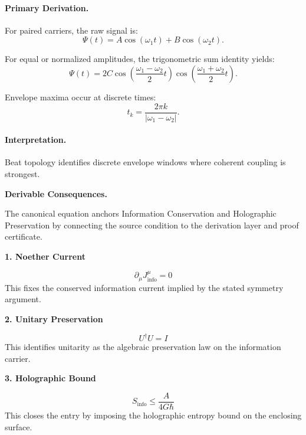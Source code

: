 \paragraph{Primary Derivation.}
For paired carriers, the raw signal is:
\begin{equation}
\Psi(t)=A\cos(\omega_1t)+B\cos(\omega_2t).
\end{equation}

For equal or normalized amplitudes, the trigonometric sum identity yields:
\begin{equation}
\Psi(t)
=
2C
\cos\left(
\frac{\omega_1-\omega_2}{2}t
\right)
\cos\left(
\frac{\omega_1+\omega_2}{2}t
\right).
\end{equation}

Envelope maxima occur at discrete times:
\begin{equation}
\boxed{
t_k=
\frac{2\pi k}{|\omega_1-\omega_2|}.
}
\end{equation}

\paragraph{Interpretation.}
Beat topology identifies discrete envelope windows where coherent coupling is strongest.

\par\vspace{0.35em}
\noindent\textbf{Derivable Consequences.}\quad
\begingroup
\footnotesize
\raggedright
The canonical equation anchors Information Conservation and Holographic Preservation by connecting the source condition to the derivation layer and proof certificate.
\par\endgroup

\noindent\textbf{1. Noether Current}\par
\[
\partial_{\mu}J^{\mu}_{\mathrm{info}}=0
\]
\noindent This fixes the conserved information current implied by the stated symmetry argument.\par
\noindent\textbf{2. Unitary Preservation}\par
\[
U^{\dagger}U=I
\]
\noindent This identifies unitarity as the algebraic preservation law on the information carrier.\par
\noindent\textbf{3. Holographic Bound}\par
\[
S_{\mathrm{info}}\leq\frac{A}{4G\hbar}
\]
\noindent This closes the entry by imposing the holographic entropy bound on the enclosing surface.\par

